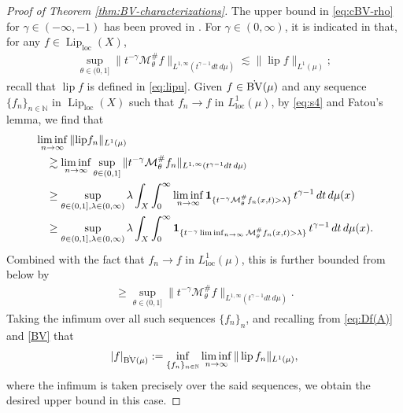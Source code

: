 \documentclass[11pt]{amsart}
\theoremstyle{definition}
\theoremstyle{remark}
\numberwithin{equation}{section}
\newcommand{\abs}[1]{|#1|}
\newcommand{\Norm}[2]{\|#1\|_{#2}}
\begin{document}
\begin{proof}[Proof of Theorem \ref{thm:BV-characterizations}]
The upper bound in \eqref{eq:cBV-rho} for $\gamma\in(-\infty,-1)$
has been proved in \cite[(6.3)]{DLYYZ}. For $\gamma\in(0,\infty)$,
it is indicated in \cite[Section 4.1]{DLYYZ} that, for any $f\in
\operatorname{Lip}_{\mathrm{loc}}(X)$,
\begin{align}\label{eq:s4}
\sup_{\theta\in(0,1]}\Norm{t^{-\gamma}\mathcal
M_\theta^{\#}f}{L^{1,\infty}(t^{\gamma-1}dt\,d\mu)}
   \lesssim\Norm{{\operatorname{lip}}f}{L^1(\mu)};
\end{align}
recall that $\operatorname{lip}f$ is defined in \eqref{eq:lipu}.
Given $f\in \dot{\rm{BV}}(\mu)$ and any sequence $\{f_n\}_{n\in\mathbb{N}}
$ in  $\operatorname{Lip}_{\mathrm{loc}}(X)$ such that $f_n\to f$ in
$L^1_{\mathrm{loc}}(\mu)$,
by \eqref{eq:s4} and Fatou's lemma, we find that
\begin{align*}
&\liminf_{n\to\infty}\Norm{{\operatorname{lip}}f_n}{L^1(\mu)}\\
&\quad\gtrsim\liminf_{n\to\infty}\sup_{\theta\in(0,1]}\Norm{t^{-\gamma}
\mathcal M_\theta^{\#}f_n}{L^{1,\infty}(t^{\gamma-1}dt\,d\mu)}\\
&\quad\ge
\sup_{\theta\in(0,1],\lambda\in(0,\infty)}\lambda\int_X\int_{0}^{\infty}\liminf_{n\to\infty}
{\bf 1}_{\{t^{-\gamma}
\mathcal M_\theta^{\#}f_n(x,t)>\lambda\}}\,t^{\gamma-1}\,dt\,d\mu(x)\\
&\quad\ge \sup_{\theta\in(0,1],\lambda\in(0,\infty)}\lambda\int_X\int_{0}^{\infty}
{\bf 1}_{\{t^{-\gamma}\liminf_{n\to\infty}
\mathcal M_\theta^{\#}f_n(x,t)>\lambda\}}\,t^{\gamma-1}\,dt\,d\mu(x).
\end{align*}
Combined with the fact that $f_n\to f$ in $L^1_{\mathrm{loc}}(\mu)$, this is
further bounded from below by
\begin{align*}
\ge\sup_{\theta\in(0,1]}\Norm{t^{-\gamma}\mathcal
M_\theta^{\#}f}{L^{1,\infty}(t^{\gamma-1}dt\,d\mu)}.
\end{align*}
Taking the infimum over all such sequences $\{f_n\}_n$, and recalling from \eqref{eq:Df(A)}
and \eqref{BV} that
\begin{equation*}
  \abs{f}_{\dot{\rm BV}(\mu)}:=\inf_{\{f_n\}_{n\in\mathbb
  N}}\liminf_{n\to\infty}\Norm{\operatorname{lip}f_n}{L^1(\mu)},
\end{equation*}
where the infimum is taken precisely over the said sequences, we obtain the desired upper
bound in this case.


\end{proof}
\end{document}
